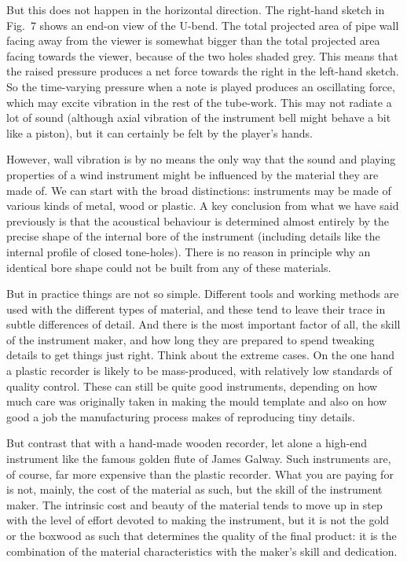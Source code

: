   But this does not happen in the horizontal direction. The right-hand sketch 
  in Fig.\ 7 shows an end-on view of the U-bend. The total projected area of 
  pipe wall facing away from the viewer is somewhat bigger than the total 
  projected area facing towards the viewer, because of the two holes shaded 
  grey. This means that the raised pressure produces a net force towards the 
  right in the left-hand sketch. So the time-varying pressure when a note is 
  played produces an oscillating force, which may excite vibration in the rest 
  of the tube-work. This may not radiate a lot of sound (although axial 
  vibration of the instrument bell might behave a bit like a piston), but it 
  can certainly be felt by the player’s hands. 

  However, wall vibration is by no means the only way that the sound and 
  playing properties of a wind instrument might be influenced by the material 
  they are made of. We can start with the broad distinctions: instruments may 
  be made of various kinds of metal, wood or plastic. A key conclusion from 
  what we have said previously is that the acoustical behaviour is determined 
  almost entirely by the precise shape of the internal bore of the instrument 
  (including details like the internal profile of closed tone-holes). There is 
  no reason in principle why an identical bore shape could not be built from 
  any of these materials. 

  But in practice things are not so simple. Different tools and working methods 
  are used with the different types of material, and these tend to leave their 
  trace in subtle differences of detail. And there is the most important factor 
  of all, the skill of the instrument maker, and how long they are prepared to 
  spend tweaking details to get things just right. Think about the extreme 
  cases. On the one hand a plastic recorder is likely to be mass-produced, with 
  relatively low standards of quality control. These can still be quite good 
  instruments, depending on how much care was originally taken in making the 
  mould template and also on how good a job the manufacturing process makes of 
  reproducing tiny details. 

  But contrast that with a hand-made wooden recorder, let alone a high-end 
  instrument like the famous golden flute of James Galway. Such instruments 
  are, of course, far more expensive than the plastic recorder. What you are 
  paying for is not, mainly, the cost of the material as such, but the skill of 
  the instrument maker. The intrinsic cost and beauty of the material tends to 
  move up in step with the level of effort devoted to making the instrument, 
  but it is not the gold or the boxwood as such that determines the quality of 
  the final product: it is the combination of the material characteristics with 
  the maker’s skill and dedication. 

